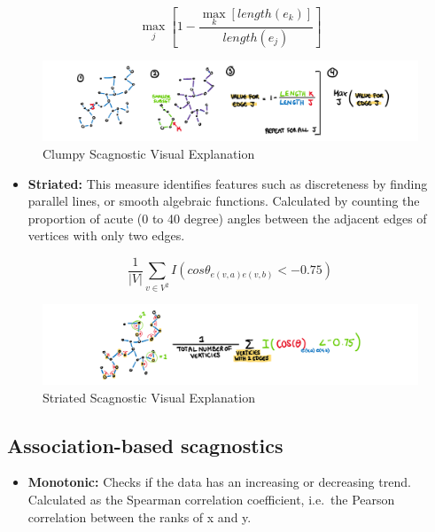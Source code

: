 \[\max_{j}[1-\frac{\max_{k}[length(e_k)]}{length(e_j)}]\]

\begin{Schunk}
\begin{figure}
\includegraphics[width=1\linewidth,height=0.2\textheight]{figures/drawclumpy} \caption[Clumpy Scagnostic Visual Explanation]{Clumpy Scagnostic Visual Explanation}\label{fig:clumpyscag}
\end{figure}
\end{Schunk}

\begin{itemize}
\tightlist
\item
  \textbf{Striated:} This measure identifies features such as
  discreteness by finding parallel lines, or smooth algebraic functions.
  Calculated by counting the proportion of acute (0 to 40 degree) angles
  between the adjacent edges of vertices with only two edges.
\end{itemize}

\[\frac1{|V|}\sum_{v \in V^{2}}I(cos\theta_{e(v,a)e(v,b)}<-0.75)\]

\begin{Schunk}
\begin{figure}
\includegraphics[width=1\linewidth,height=0.2\textheight]{figures/drawstriated} \caption[Striated Scagnostic Visual Explanation]{Striated Scagnostic Visual Explanation}\label{fig:striatedscag}
\end{figure}
\end{Schunk}

\hypertarget{association-based-scagnostics}{%
\subsection{Association-based
scagnostics}\label{association-based-scagnostics}}

\begin{itemize}
\tightlist
\item
  \textbf{Monotonic:} Checks if the data has an increasing or decreasing
  trend. Calculated as the Spearman correlation coefficient, i.e.~the
  Pearson correlation between the ranks of x and y.
\end{itemize}

